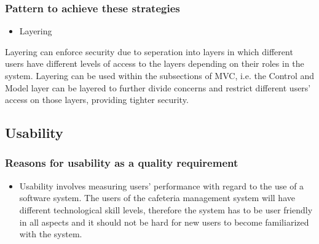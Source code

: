\documentclass[a4paper,12pt]{article}
\begin{document}
\subsubsection{Pattern to achieve these strategies}
\begin{itemize}
 \item Layering
\end{itemize}
Layering can enforce security due to seperation into layers in which different users have different levels of access to the layers depending on their roles in the system.
Layering can be used within the subsections of MVC, i.e. the Control and Model layer can be layered to further divide concerns and restrict different users' access on those layers, providing tighter security.

\subsection{Usability}

 \subsubsection{Reasons for usability as a quality requirement}
 \begin{itemize}
 \item Usability involves measuring users' performance with regard to the use of a software system. The users of the cafeteria management system will have different technological skill levels, therefore the system has to be user friendly in all aspects and it should not be hard for new users to become familiarized with the system.

 \end{itemize}
\end{document}
